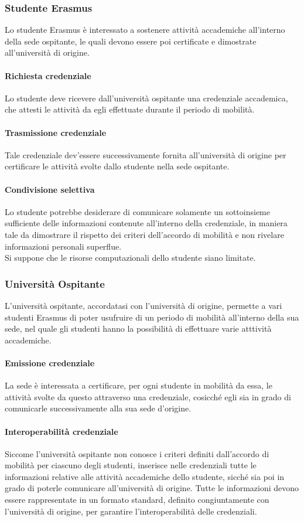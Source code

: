 \documentclass[a4paper,12pt]{article}
\begin{document}
\subsubsection{Studente Erasmus}
Lo studente Erasmus è interessato a sostenere attività accademiche all'interno della sede ospitante, le quali devono essere poi certificate e dimostrate all'università di origine.
\paragraph{Richiesta credenziale} Lo studente deve ricevere dall'università ospitante una credenziale accademica, che attesti le attività da egli effettuate durante il periodo di mobilità.
\paragraph{Trasmissione credenziale} Tale credenziale dev'essere successivamente fornita all'università di origine per certificare le attività svolte dallo studente nella sede ospitante. 
\paragraph{Condivisione selettiva} Lo studente potrebbe desiderare di comunicare solamente un sottoinsieme sufficiente delle informazioni contenute all'interno della credenziale, in maniera tale da dimostrare il rispetto dei criteri dell'accordo di mobilità e non rivelare informazioni personali superflue.
\\[0.5em] Si suppone che le risorse computazionali dello studente siano limitate. 

\subsubsection{Università Ospitante}
L'università ospitante, accordatasi con l'università di origine, permette a vari studenti Erasmus di poter usufruire di un periodo di mobilità all'interno della sua sede, nel quale gli studenti hanno la possibilità di effettuare varie atttività accademiche.
\paragraph{Emissione credenziale} La sede è interessata a certificare, per ogni studente in mobilità da essa, le attività svolte da questo attraverso una credenziale, cosicché egli sia in grado di comunicarle successivamente alla sua sede d'origine.
\paragraph{Interoperabilità credenziale} Siccome l'università ospitante non conosce i criteri definiti dall'accordo di mobilità per ciascuno degli studenti, inserisce nelle credenziali tutte le informazioni relative alle attività accademiche dello studente, sicché sia poi in grado di poterle comunicare all'università di origine. Tutte le informazioni devono essere rappresentate in un formato standard, definito congiuntamente con l'università di origine, per garantire l'interoperabilità delle credenziali.
\end{document}
